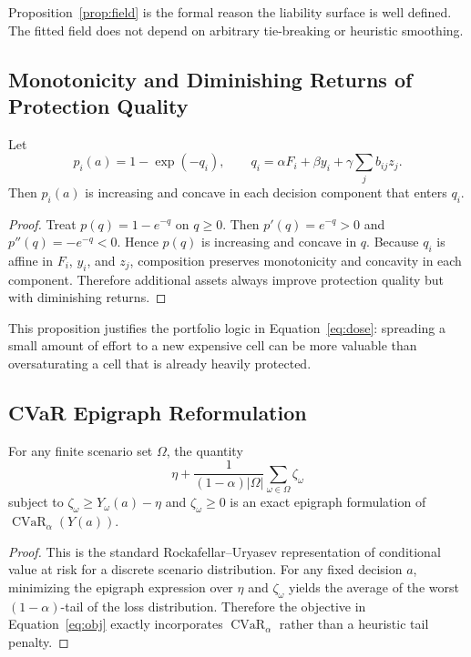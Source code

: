 Proposition~\ref{prop:field} is the formal reason the liability surface is well defined. The fitted field does not depend on arbitrary tie-breaking or heuristic smoothing.

\subsection{Monotonicity and Diminishing Returns of Protection Quality}
\begin{proposition}
\label{prop:quality}
Let
\[
p_i(a)=1-\exp(-q_i),
\qquad
q_i=\alpha F_i+\beta y_i+\gamma\sum_j b_{ij}z_j.
\]
Then \(p_i(a)\) is increasing and concave in each decision component that enters \(q_i\).
\end{proposition}
\begin{proof}
Treat \(p(q)=1-e^{-q}\) on \(q\ge 0\). Then \(p'(q)=e^{-q}>0\) and \(p''(q)=-e^{-q}<0\). Hence \(p(q)\) is increasing and concave in \(q\). Because \(q_i\) is affine in \(F_i\), \(y_i\), and \(z_j\), composition preserves monotonicity and concavity in each component. Therefore additional assets always improve protection quality but with diminishing returns.
\end{proof}

This proposition justifies the portfolio logic in Equation~\eqref{eq:dose}: spreading a small amount of effort to a new expensive cell can be more valuable than oversaturating a cell that is already heavily protected.

\subsection{CVaR Epigraph Reformulation}
\begin{proposition}
\label{prop:cvar}
For any finite scenario set \(\Omega\), the quantity
\[
\eta + \frac{1}{(1-\alpha)|\Omega|}\sum_{\omega\in\Omega}\zeta_\omega
\]
subject to \(\zeta_\omega\ge Y_\omega(a)-\eta\) and \(\zeta_\omega\ge 0\) is an exact epigraph formulation of \(\operatorname{CVaR}_\alpha(Y(a))\).
\end{proposition}
\begin{proof}
This is the standard Rockafellar--Uryasev representation of conditional value at risk for a discrete scenario distribution. For any fixed decision \(a\), minimizing the epigraph expression over \(\eta\) and \(\zeta_\omega\) yields the average of the worst \((1-\alpha)\)-tail of the loss distribution. Therefore the objective in Equation~\eqref{eq:obj} exactly incorporates \(\operatorname{CVaR}_\alpha\) rather than a heuristic tail penalty.
\end{proof}

